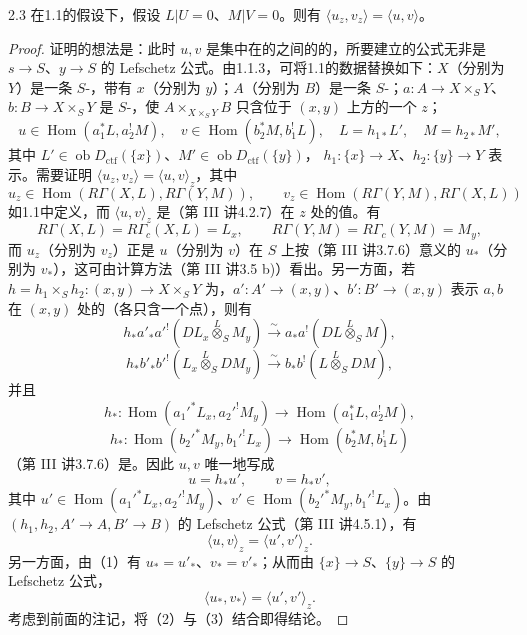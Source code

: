 \begin{SGAresult}{}{2.3}
在1.1的假设下，假设 $L|U=0$、$M|V=0$。则有 $\langle u_z,v_z\rangle=\langle u,v\rangle$。
\end{SGAresult}
\begin{proof}
证明的想法是：此时 $u,v$ 是集中在的之间的的，所要建立的公式无非是 $s\to S$、$y\to S$ 的 Lefschetz 公式。由1.1.3，可将1.1的数据替换如下：$X$（分别为 $Y$）是一条 $S$-，带有 $x$（分别为 $y$）；$A$（分别为 $B$）是一条 $S$-；$a:A\to X\times_S Y$、$b:B\to X\times_S Y$ 是 $S$-，使 $A\times_{X\times_S Y}B$ 只含位于 $(x,y)$ 上方的一个 $z$；
\[
 u\in\operatorname{Hom}(a_1^*L,a_2^!M),\quad
 v\in\operatorname{Hom}(b_2^*M,b_1^!L),\quad
 L=h_{1*}L',\quad M=h_{2*}M',
\]
其中 $L'\in\operatorname{ob}D_{\mathrm{ctf}}(\{x\})$、$M'\in\operatorname{ob}D_{\mathrm{ctf}}(\{y\})$，
$h_1:\{x\}\to X$、$h_2:\{y\}\to Y$ 表示。需要证明 $\langle u_z,v_z\rangle=\langle u,v\rangle_z$，其中
\[
 u_z\in\operatorname{Hom}(R\Gamma(X,L),R\Gamma(Y,M)),\qquad
 v_z\in\operatorname{Hom}(R\Gamma(Y,M),R\Gamma(X,L))
\]
如1.1中定义，而 $\langle u,v\rangle_z$ 是（第 III 讲4.2.7）在 $z$ 处的值。有
\[
 R\Gamma(X,L)=R\Gamma_c(X,L)=L_x,\qquad
 R\Gamma(Y,M)=R\Gamma_c(Y,M)=M_y,
\]
而 $u_z$（分别为 $v_z$）正是 $u$（分别为 $v$）在 $S$ 上按（第 III 讲3.7.6）意义的 $u_*$（分别为 $v_*$），这可由计算方法（第 III 讲3.5 b)）看出。另一方面，若 $h=h_1\times_S h_2:(x,y)\to X\times_S Y$ 为，$a':A'\to(x,y)$、$b':B'\to(x,y)$ 表示 $a,b$ 在 $(x,y)$ 处的（各只含一个点），则有
\[
 h_*a'_*a'^!(DL_x\overset L\otimes_S M_y)\xrightarrow{\sim}
 a_*a^!(DL\overset L\otimes_S M),
\]
\[
 h_*b'_*b'^!(L_x\overset L\otimes_S DM_y)\xrightarrow{\sim}
 b_*b^!(L\overset L\otimes_S DM),
\]
并且
\[
 h_*:\operatorname{Hom}(a_1'^*L_x,a_2'^!M_y)\longrightarrow
 \operatorname{Hom}(a_1^*L,a_2^!M),
\]
\[
 h_*:\operatorname{Hom}(b_2'^*M_y,b_1'^!L_x)\longrightarrow
 \operatorname{Hom}(b_2^*M,b_1^!L)
\]
（第 III 讲3.7.6）是。因此 $u,v$ 唯一地写成
\[
 u=h_*u',\qquad v=h_*v',\tag{1}
\]
其中 $u'\in\operatorname{Hom}(a_1'^*L_x,a_2'^!M_y)$、$v'\in\operatorname{Hom}(b_2'^*M_y,b_1'^!L_x)$。由 $(h_1,h_2,A'\to A,B'\to B)$ 的 Lefschetz 公式（第 III 讲4.5.1），有
\[
 \langle u,v\rangle_z=\langle u',v'\rangle_z.\tag{2}
\]
另一方面，由（1）有 $u_*=u'_*$、$v_*=v'_*$；从而由 $\{x\}\to S$、$\{y\}\to S$ 的 Lefschetz 公式，
\[
 \langle u_*,v_*\rangle=\langle u',v'\rangle_z.\tag{3}
\]
考虑到前面的注记，将（2）与（3）结合即得结论。
\end{proof}

